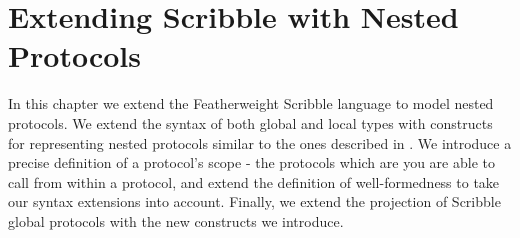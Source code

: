 \documentclass[12pt,twoside]{report}
\begin{document}


\chapter{Extending Scribble with Nested Protocols}\label{scribble-extensions-chapter}
In this chapter we extend the Featherweight Scribble language\cite{scribble} to model nested protocols. We extend the syntax of both global and local types with constructs for representing nested protocols similar to the ones described in \cite{nestedprotocols}. We introduce a precise definition of a protocol's scope - the protocols which are you are able to call from within a protocol, and extend the definition of well-formedness to take our syntax extensions into account. Finally, we extend the projection of Scribble global protocols with the new constructs we introduce.
\end{document}
